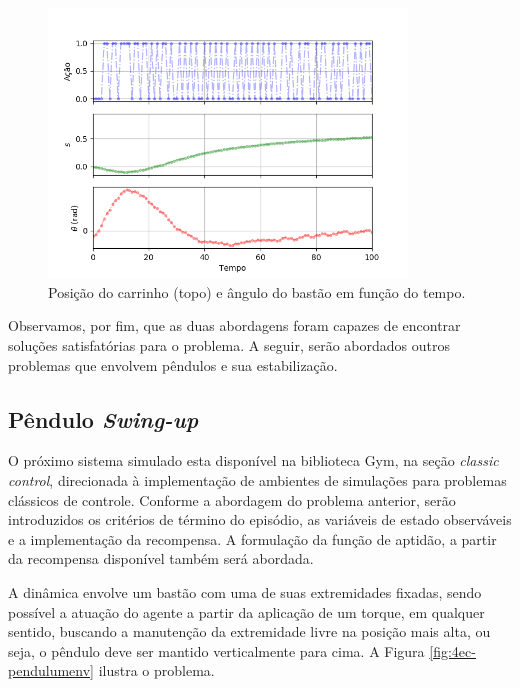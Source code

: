 \begin{figure}[H]
	\centering
	\includegraphics[width=0.85\textwidth]{02_desenvolvimento/04_EC_Fig_CartpoleDQNVarGraf.png}
	\caption{Posição do carrinho (topo) e ângulo do bastão em função do tempo.}
	\label{fig:4ec-cartpoledqnvargraf}
\end{figure}

Observamos, por fim, que as duas abordagens foram capazes de encontrar soluções satisfatórias para o problema. A seguir, serão abordados outros problemas que envolvem pêndulos e sua estabilização. 

\subsection{Pêndulo \textit{Swing-up}}\label{ssec:4ec-pendulum}

O próximo sistema simulado esta disponível na biblioteca Gym, na seção \textit{classic control}, direcionada à implementação de ambientes de simulações para problemas clássicos de controle. Conforme a abordagem do problema anterior, serão introduzidos os critérios de término do episódio, as variáveis de estado observáveis e a implementação da recompensa. A formulação da função de aptidão, a partir da recompensa disponível também será abordada.

A dinâmica envolve um bastão com uma de suas extremidades fixadas, sendo possível a atuação do agente a partir da aplicação de um torque, em qualquer sentido, buscando a manutenção da extremidade livre na posição mais alta, ou seja, o pêndulo deve ser mantido verticalmente para cima. A Figura \ref{fig:4ec-pendulumenv} ilustra o problema.

